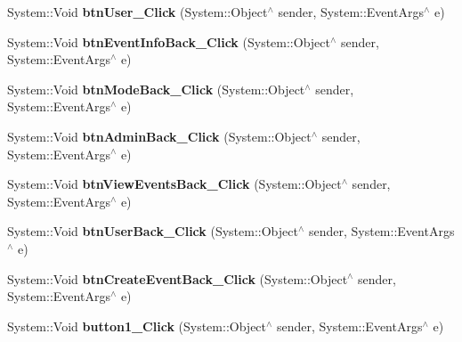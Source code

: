 \begin{DoxyCompactItemize}
\item 
\mbox{\label{class_project1_1_1_my_form_a3d68f196cb4c9f6ce72f8dbd58525f57}} 
System\+::\+Void {\bfseries btn\+User\+\_\+\+Click} (System\+::\+Object$^\wedge$ sender, System\+::\+Event\+Args$^\wedge$ e)
\item 
\mbox{\label{class_project1_1_1_my_form_a30766a266de8434210e69d84938dc839}} 
System\+::\+Void {\bfseries btn\+Event\+Info\+Back\+\_\+\+Click} (System\+::\+Object$^\wedge$ sender, System\+::\+Event\+Args$^\wedge$ e)
\item 
\mbox{\label{class_project1_1_1_my_form_affc594c3c71625b1aac2fb6fdd091da4}} 
System\+::\+Void {\bfseries btn\+Mode\+Back\+\_\+\+Click} (System\+::\+Object$^\wedge$ sender, System\+::\+Event\+Args$^\wedge$ e)
\item 
\mbox{\label{class_project1_1_1_my_form_a98ab6f12bef7872afe1d405db5032c3d}} 
System\+::\+Void {\bfseries btn\+Admin\+Back\+\_\+\+Click} (System\+::\+Object$^\wedge$ sender, System\+::\+Event\+Args$^\wedge$ e)
\item 
\mbox{\label{class_project1_1_1_my_form_a4ae9fa82ca1d31f89fd77af22b9920c3}} 
System\+::\+Void {\bfseries btn\+View\+Events\+Back\+\_\+\+Click} (System\+::\+Object$^\wedge$ sender, System\+::\+Event\+Args$^\wedge$ e)
\item 
\mbox{\label{class_project1_1_1_my_form_a7ea6703dc73f11d54dfca176e790c784}} 
System\+::\+Void {\bfseries btn\+User\+Back\+\_\+\+Click} (System\+::\+Object$^\wedge$ sender, System\+::\+Event\+Args$^\wedge$ e)
\item 
\mbox{\label{class_project1_1_1_my_form_a90463883265bebcdf6c12e0b62f882a2}} 
System\+::\+Void {\bfseries btn\+Create\+Event\+Back\+\_\+\+Click} (System\+::\+Object$^\wedge$ sender, System\+::\+Event\+Args$^\wedge$ e)
\item 
\mbox{\label{class_project1_1_1_my_form_ad79eb525e3acdc16cb70d2243371e2b8}} 
System\+::\+Void {\bfseries button1\+\_\+\+Click} (System\+::\+Object$^\wedge$ sender, System\+::\+Event\+Args$^\wedge$ e)

\end{DoxyCompactItemize}
